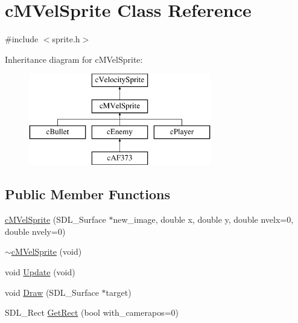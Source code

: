 \hypertarget{classc_m_vel_sprite}{\section{c\-M\-Vel\-Sprite Class Reference}
\label{classc_m_vel_sprite}
}


{\ttfamily \#include $<$sprite.\-h$>$}

Inheritance diagram for c\-M\-Vel\-Sprite\-:\begin{figure}[H]
\begin{center}
\leavevmode
\includegraphics[height=4.000000cm]{classc_m_vel_sprite}
\end{center}
\end{figure}
\subsection*{Public Member Functions}
\begin{DoxyCompactItemize}
\item 
\hyperlink{classc_m_vel_sprite_a133741fdaeec59700dbc0e094d1e3ad6}{c\-M\-Vel\-Sprite} (S\-D\-L\-\_\-\-Surface $\ast$new\-\_\-image, double x, double y, double nvelx=0, double nvely=0)
\item 
\hyperlink{classc_m_vel_sprite_ac7493a3ea06d6a7d3aa99488a135b2e1}{$\sim$c\-M\-Vel\-Sprite} (void)
\item 
void \hyperlink{classc_m_vel_sprite_a0472c4eecda7bba06bef8bb5a8a2312f}{Update} (void)
\item 
void \hyperlink{classc_m_vel_sprite_a4ab825cec1e8d50a9c5a7afa5cd8ec93}{Draw} (S\-D\-L\-\_\-\-Surface $\ast$target)
\item 
S\-D\-L\-\_\-\-Rect \hyperlink{classc_m_vel_sprite_ad500f3c6a50c0d289f9c662f68170970}{Get\-Rect} (bool with\-\_\-camerapos=0)
\end{DoxyCompactItemize}
